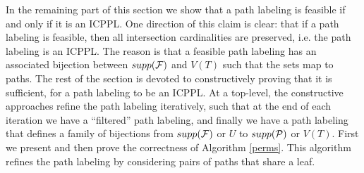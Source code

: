 \documentclass{llncs}
\def\cF{{\cal F}}
\def\cP{{\cal P}}
\begin{document}
\noindent
In the remaining part of this section we show that a path labeling is
feasible if and only if it is an ICPPL.  One direction of this claim
is clear: that if a path labeling is feasible, then all intersection
cardinalities are preserved, i.e. the path labeling is an ICPPL.  The
reason is that a feasible path labeling has an associated bijection
between $supp(\cF)$ and $V(T)$ such that the sets map to paths. The
rest of the section is devoted to constructively proving that it is
sufficient, for a path labeling to be an ICPPL.  At a top-level, the
constructive approaches refine the path labeling iteratively, such
that at the end of each iteration we have a ``filtered'' path labeling,
and finally we have a path labeling that defines a family of
bijections from $supp(\cF)$ or $U$ to $supp(\cP)$ or $V(T)$.  First we
present and then prove the correctness of Algorithm \ref{perms}.  This
algorithm refines the path labeling by considering pairs of paths that
share a leaf.

\end{document}

